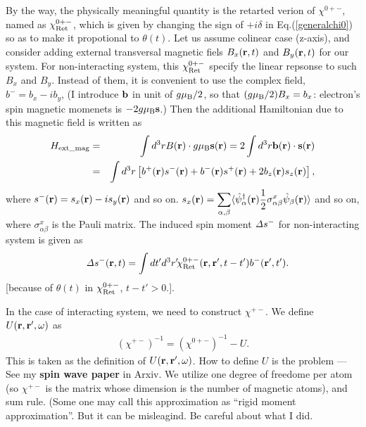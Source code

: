 \documentclass[a4paper,10pt,epsf,fleqn]{article}
\newcommand{\bfr}{{\bf r}}
\newcommand{\ds}{\displaystyle}
\newcommand{\D}{{\it \Delta}}
\newcommand{\req}[1]{Eq.(\ref{#1})}
\begin{document}
{{{By the way, the physically meaningful quantity is the retarted verion of $\chi^{0+-}$,
named as $\chi^{0+-}_{\rm Ret}$, which is given by changing the sign of $+ i \delta$ in \req{generalchi0}
so as to make it propotional to $\theta(t)$.
Let us assume colinear case (z-axis), 
and consider adding external transversal magnetic fiels $B_x(\bfr,t)$ and $B_y(\bfr,t)$ 
for our system. For non-interacting system, this $\chi^{0+-}_{\rm Ret}$ 
specify the linear repsonse to such $B_x$ and $B_y$.
Instead of them, it is convenient to use the complex field, $b^- = b_x -i b_y$,
(I introduce ${\bf b}$ in unit of 
$g \mu_{\rm B}/2$, so that $(g \mu_{\rm B}/2) B_x =  b_x$:
electron's spin magnetic momenets is $-2 g \mu_{\rm B} {\bf s}$.)
Then the additional Hamiltonian due to this magnetic field is written
as 
\begin{eqnarray}
H_{\rm ext\_mag} 
&=&  \int d^3r B(\bfr) \cdot g \mu_{\rm B} {\bf s}(\bfr)
=  2 \int d^3r {\bf b}(\bfr) \cdot {\bf s} (\bfr) \nonumber \\
&=&  \int d^3r \left[ b^+(\bfr) s^-(\bfr) + b^-(\bfr)s^+(\bfr) 
+ 2 b_z(\bfr) s_z(\bfr) \right],
\end{eqnarray}
where $s^-(\bfr) = s_x(\bfr)- i s_y(\bfr)$ and so on.
$\ds s_x(\bfr) = \sum_{\alpha,\beta} 
\langle \hat{\psi}^\dagger_\alpha(\bfr) \frac{1}{2} \sigma^x_{\alpha \beta}
\hat{\psi}_{\beta}(\bfr) \rangle $
and so on, where $\sigma^x_{\alpha \beta}$ is the Pauli matrix.
The induced spin moment $\D s^-$ for non-interacting system is given as
\begin{eqnarray}
&& \D s^-(\bfr,t) = \int dt' d^3r' \! \chi^{0+-}_{\rm Ret}(\bfr,\bfr',t-t') b^-(\bfr',t').
\end{eqnarray}
[because of $\theta(t)$ in  $\chi^{0+-}_{\rm Ret}$, $t-t'>0$.].

In the case of interacting system, we need to construct $\chi^{+-}$.
We define ${U}(\bfr,\bfr',\omega)$ as
\begin{eqnarray}
(\chi^{+-})^{-1} =  \left(\chi^{0+-}\right)^{-1} - {U}.
\label{chirpa0}
\end{eqnarray}
This is taken as the definition of ${U}(\bfr,\bfr',\omega)$.
How to define $U$ is the problem --- See my {\bf spin wave paper} in Arxiv.
We utilize one degree of freedome per atom (so $\chi^{+-}$ is 
the matrix whose dimension is the number of magnetic atoms), and sum rule.
(Some one may call this approximation as ``rigid moment approximation''.
 But it can be misleagind. Be careful about what I did.


}}}
\end{document}
